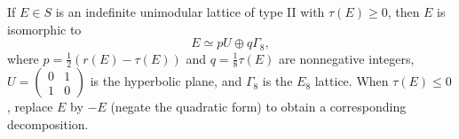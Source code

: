 If $E \in S$ is an indefinite unimodular lattice of type II with $\tau(E) \geq 0$, then $E$ is isomorphic to
$$
E \simeq pU \oplus q\Gamma_8,
$$
where $p = \frac{1}{2}(r(E) - \tau(E))$ and $q = \frac{1}{8}\tau(E)$ are nonnegative integers, $U = \begin{pmatrix}0 & 1 \\ 1 & 0\end{pmatrix}$ is the hyperbolic plane, and $\Gamma_8$ is the $E_8$ lattice. When $\tau(E) \leq 0$, replace $E$ by $-E$ (negate the quadratic form) to obtain a corresponding decomposition.
